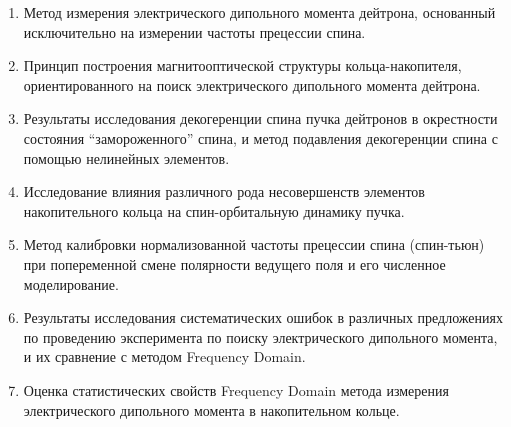 {}
\begin{enumerate}
	\item Метод измерения электрического дипольного момента дейтрона, основанный исключительно на измерении частоты прецессии спина.
	\item Принцип построения магнитооптической структуры кольца-накопителя, ориентированного на поиск электрического дипольного момента дейтрона.
	\item Результаты исследования декогеренции спина пучка дейтронов в окрестности состояния ``замороженного'' спина, и метод подавления декогеренции спина с помощью нелинейных элементов.
	\item Исследование влияния различного рода несовершенств элементов накопительного кольца 
	на спин-орбитальную динамику пучка. 
	\item Метод калибровки нормализованной частоты прецессии спина (спин-тьюн) при попеременной смене полярности ведущего поля и его численное моделирование.
	\item Результаты исследования систематических ошибок в различных предложениях по проведению эксперимента по поиску электрического дипольного момента, и их сравнение с методом Frequency Domain. 
	\item Оценка статистических свойств Frequency Domain метода измерения электрического дипольного момента 
	в накопительном кольце.
\end{enumerate}

